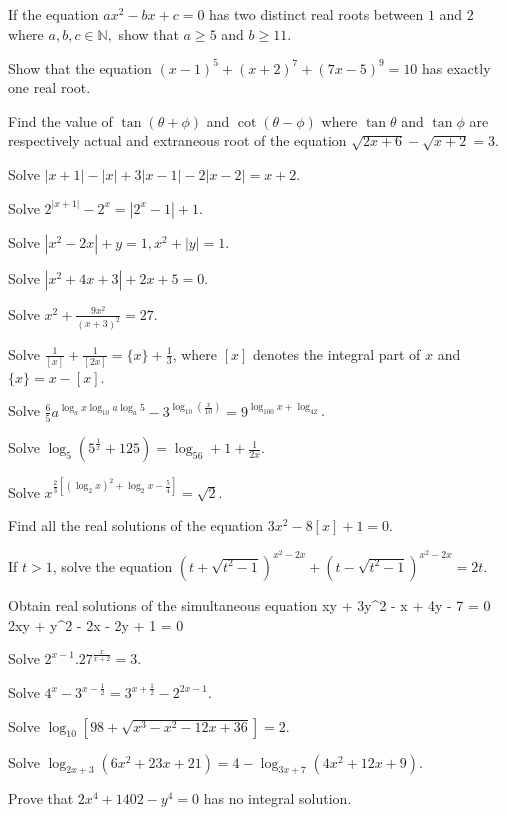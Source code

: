 \item If the equation $ax^2 - bx + c = 0$ has two distinct real roots between $1$ and $2$ where $a, b, c\in\mathbb{N},$ show that
  $a\geq 5$ and $b\geq 11$.
\item Show that the equation $(x - 1)^5 + (x + 2)^7 + (7x - 5)^9 = 10$ has exactly one real root.
\item Find the value of $\tan(\theta + \phi)$ and $\cot(\theta - \phi)$ where $\tan\theta$ and $\tan\phi$ are respectively actual
  and extraneous root of the equation $\sqrt{2x + 6} - \sqrt{x + 2} = 3$.
\item Solve $|x + 1| - |x| + 3|x - 1| - 2|x - 2| = x + 2$.
\item Solve $2^{|x + 1|} - 2^x = |2^x - 1| + 1$.
\item Solve $|x^2 - 2x| + y = 1, x^2 + |y| = 1$.
\item Solve $|x^2 + 4x + 3| + 2x + 5 = 0$.
\item Solve $x^2 + \frac{9x^2}{(x + 3)^2} = 27$.
\item Solve $\frac{1}{[x]} + \frac{1}{[2x]} = \{x\} + \frac{1}{3}$, where $[x]$ denotes the integral part of $x$ and $\{x\} = x -
  [x]$.
\item Solve $\frac{6}{5}a^{\log_ax\log_{10}a\log_a5} - 3^{\log_{10}\left(\tfrac{x}{10}\right)} = 9^{\log_{100}x + \log_42}$.
\item Solve $\log_5{\left(5^{\tfrac{1}{x}} + 125\right)} = \log_56 + 1 + \frac{1}{2x}$.
\item Solve $x^{\tfrac{2}{3}\left[(\log_2x)^2 + \log_2x - \tfrac{5}{4}\right]} = \sqrt{2}$.
\item Find all the real solutions of the equation $3x^2 - 8[x] + 1 = 0$.
\item If $t > 1$, solve the equation $(t + \sqrt{t^2 - 1})^{x^2 - 2x} + (t - \sqrt{t^2 - 1})^{x^2 - 2x} = 2t$.
\item Obtain real solutions of the simultaneous equation \startformula xy + 3y^2 - x + 4y - 7 = 0\stopformula
  \startformula 2xy + y^2 - 2x - 2y + 1 = 0\stopformula
\item Solve $2^{x - 1}.27^{\tfrac{x}{x + 2}} = 3$.
\item Solve $4^x - 3^{x - \tfrac{1}{2}} = 3^{x + \tfrac{1}{2}} - 2^{2x - 1}$.
\item Solve $\log_{10}[98 + \sqrt{x^3 - x^2 - 12x + 36}] = 2$.
\item Solve $\log_{2x + 3}(6x^2 + 23x + 21) = 4 - \log_{3x + 7}(4x^2 + 12x + 9)$.
\item Prove that $2x^4 + 1402 - y^4 = 0$ has no integral solution.
